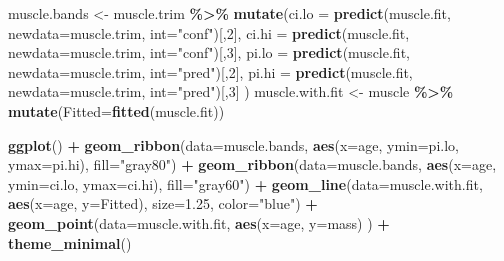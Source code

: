 \documentclass[
]{book}
\newenvironment{Shaded}{\begin{snugshade}}{\end{snugshade}}
\newcommand{\AttributeTok}[1]{\textcolor[rgb]{0.13,0.29,0.53}{#1}}
\newcommand{\DecValTok}[1]{\textcolor[rgb]{0.00,0.00,0.81}{#1}}
\newcommand{\FloatTok}[1]{\textcolor[rgb]{0.00,0.00,0.81}{#1}}
\newcommand{\FunctionTok}[1]{\textcolor[rgb]{0.13,0.29,0.53}{\textbf{#1}}}
\newcommand{\NormalTok}[1]{#1}
\newcommand{\OtherTok}[1]{\textcolor[rgb]{0.56,0.35,0.01}{#1}}
\newcommand{\SpecialCharTok}[1]{\textcolor[rgb]{0.81,0.36,0.00}{\textbf{#1}}}
\newcommand{\StringTok}[1]{\textcolor[rgb]{0.31,0.60,0.02}{#1}}
\begin{document}
\begin{Shaded}
\begin{Highlighting}[]
\NormalTok{muscle.bands }\OtherTok{\textless{}{-}}\NormalTok{ muscle.trim }\SpecialCharTok{\%\textgreater{}\%}
  \FunctionTok{mutate}\NormalTok{(}\AttributeTok{ci.lo =} \FunctionTok{predict}\NormalTok{(muscle.fit, }\AttributeTok{newdata=}\NormalTok{muscle.trim, }\AttributeTok{int=}\StringTok{"conf"}\NormalTok{)[,}\DecValTok{2}\NormalTok{],}
         \AttributeTok{ci.hi =} \FunctionTok{predict}\NormalTok{(muscle.fit, }\AttributeTok{newdata=}\NormalTok{muscle.trim, }\AttributeTok{int=}\StringTok{"conf"}\NormalTok{)[,}\DecValTok{3}\NormalTok{],}
         \AttributeTok{pi.lo =} \FunctionTok{predict}\NormalTok{(muscle.fit, }\AttributeTok{newdata=}\NormalTok{muscle.trim, }\AttributeTok{int=}\StringTok{"pred"}\NormalTok{)[,}\DecValTok{2}\NormalTok{],}
         \AttributeTok{pi.hi =} \FunctionTok{predict}\NormalTok{(muscle.fit, }\AttributeTok{newdata=}\NormalTok{muscle.trim, }\AttributeTok{int=}\StringTok{"pred"}\NormalTok{)[,}\DecValTok{3}\NormalTok{] )}
\NormalTok{muscle.with.fit }\OtherTok{\textless{}{-}}\NormalTok{ muscle }\SpecialCharTok{\%\textgreater{}\%}
  \FunctionTok{mutate}\NormalTok{(}\AttributeTok{Fitted=}\FunctionTok{fitted}\NormalTok{(muscle.fit))}

\FunctionTok{ggplot}\NormalTok{() }\SpecialCharTok{+} 
  \FunctionTok{geom\_ribbon}\NormalTok{(}\AttributeTok{data=}\NormalTok{muscle.bands, }\FunctionTok{aes}\NormalTok{(}\AttributeTok{x=}\NormalTok{age, }\AttributeTok{ymin=}\NormalTok{pi.lo, }\AttributeTok{ymax=}\NormalTok{pi.hi), }\AttributeTok{fill=}\StringTok{"gray80"}\NormalTok{) }\SpecialCharTok{+} 
  \FunctionTok{geom\_ribbon}\NormalTok{(}\AttributeTok{data=}\NormalTok{muscle.bands, }\FunctionTok{aes}\NormalTok{(}\AttributeTok{x=}\NormalTok{age, }\AttributeTok{ymin=}\NormalTok{ci.lo, }\AttributeTok{ymax=}\NormalTok{ci.hi), }\AttributeTok{fill=}\StringTok{"gray60"}\NormalTok{) }\SpecialCharTok{+} 
  \FunctionTok{geom\_line}\NormalTok{(}\AttributeTok{data=}\NormalTok{muscle.with.fit, }\FunctionTok{aes}\NormalTok{(}\AttributeTok{x=}\NormalTok{age, }\AttributeTok{y=}\NormalTok{Fitted), }\AttributeTok{size=}\FloatTok{1.25}\NormalTok{, }\AttributeTok{color=}\StringTok{"blue"}\NormalTok{) }\SpecialCharTok{+} 
  \FunctionTok{geom\_point}\NormalTok{(}\AttributeTok{data=}\NormalTok{muscle.with.fit, }\FunctionTok{aes}\NormalTok{(}\AttributeTok{x=}\NormalTok{age, }\AttributeTok{y=}\NormalTok{mass) ) }\SpecialCharTok{+} 
  \FunctionTok{theme\_minimal}\NormalTok{()}
\end{Highlighting}
\end{Shaded}
\end{document}
